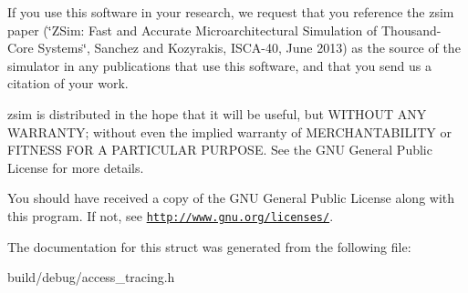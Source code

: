 If you use this software in your research, we request that you reference the zsim paper (\char`\"{}\-Z\-Sim\-: Fast and Accurate Microarchitectural Simulation of
\-Thousand-\/\-Core Systems\char`\"{}, Sanchez and Kozyrakis, I\-S\-C\-A-\/40, June 2013) as the source of the simulator in any publications that use this software, and that you send us a citation of your work.

zsim is distributed in the hope that it will be useful, but W\-I\-T\-H\-O\-U\-T A\-N\-Y W\-A\-R\-R\-A\-N\-T\-Y; without even the implied warranty of M\-E\-R\-C\-H\-A\-N\-T\-A\-B\-I\-L\-I\-T\-Y or F\-I\-T\-N\-E\-S\-S F\-O\-R A P\-A\-R\-T\-I\-C\-U\-L\-A\-R P\-U\-R\-P\-O\-S\-E. See the G\-N\-U General Public License for more details.

You should have received a copy of the G\-N\-U General Public License along with this program. If not, see \href{http://www.gnu.org/licenses/}{\tt http\-://www.\-gnu.\-org/licenses/}. 

The documentation for this struct was generated from the following file\-:\begin{DoxyCompactItemize}
\item 
build/debug/access\-\_\-tracing.\-h\end{DoxyCompactItemize}
